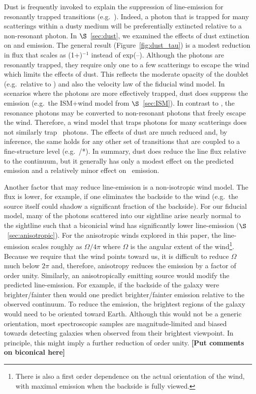 \documentclass[12pt,preprint]{aastex}
\begin{document}
Dust is frequently invoked to explain the suppression of line-emission
for resonantly trapped transitions (e.g.\ \lya).  Indeed, a photon
that is trapped for many scatterings within a dusty medium will 
be preferentially extincted relative to a non-resonant photon.  In
$\S$~\ref{sec:dust}, we examined the effects of dust extinction on 
 and  emission.  The general result
(Figure~\ref{fig:dust_tau}) is a modest
reduction in flux that scales as (1+\taud)$^{-1}$ instead of
exp(--\taud). Although the  photons are resonantly
trapped, they require only one to a few scatterings
to escape the wind which limits the effects of
dust.  This reflects the moderate opacity of the 
doublet (e.g.\ relative to \lya) and also the velocity law of the
fiducial wind model.
In scenarios where the  photons are
more effectively trapped, dust does suppress
the emission (e.g.\ the ISM+wind model from $\S$~\ref{sec:ISM}).
In contrast to , 
the  resonance photons may be
converted to non-resonant photons that freely escape the wind.
Therefore, a wind model that traps 
photons for many scatterings does not similarly trap 
\feiid\ photons.  The effects of dust are much 
reduced and, by inference, the same holds for any other set of
transitions that are coupled to a fine-structure level (e.g.\
/*).  In summary,
dust does reduce the line flux relative to the continuum, but 
it generally has only a modest effect on the predicted 
emission and a relatively minor effect on \feiis\ emission.

Another factor that may reduce line-emission is a
non-isotropic wind model. The flux is lower, for example, if one
eliminates the backside to the wind (e.g.\ the source itself could
shadow a significant fraction of the backside).  
For our fiducial model, many of the photons scattered into our
sightline arise nearly normal to the sightline such that a biconicial
wind has significantly lower line-emission
($\S$~\ref{sec:anisotropic}). 
For the anisotropic winds explored in this paper,
the line-emission scales 
roughly as $\Omega/4\pi$ where $\Omega$ is the angular extent of the
wind\footnote{There is also a first order dependence on the actual
  orientation of the wind, with maximal emission when the backside is
  fully viewed.}.  Because we require that the wind 
points toward us, it is difficult to reduce $\Omega$ much
below $2 \pi$ and, therefore, anisotropy reduces the
emission by a factor of order unity.  
Similarly, an anisotropically emitting source would modify the predicted
line-emission.  For example, if the backside of the galaxy were
brighter/fainter then would one predict brighter/fainter emission
relative to the observed continuum.
To reduce the emission, the brightest regions
of the galaxy would need to be oriented toward Earth.  Although this
would not be a
generic orientation, most spectroscopic samples are magnitude-limited
and biased towards detecting galaxies when observed from their
brightest viewpoint.  In principle, this might imply a further
reduction of order unity.
{\bf [Put comments on biconical here]}
\end{document}
